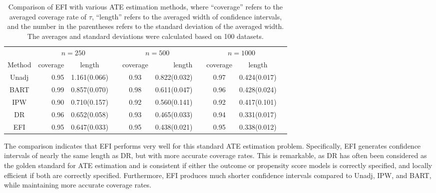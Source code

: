 \documentclass[11pt]{article}
\begin{document}
 \begin{table}[htbp]
\caption{Comparison of EFI with various ATE estimation methods, where “coverage” refers to the averaged coverage rate of  $\tau$,  “length” refers to the averaged width of confidence intervals, and the number in the parentheses refers to the standard deviation of the averaged width. The averages and standard deviations  were calculated based on 100 datasets.}
\label{causal:ATE}
\vspace{-0.15in}
\begin{center}
\begin{tabular}{crcccrcccc} \toprule
   &\multicolumn{2}{c}{$n=250$} & &  \multicolumn{2}{c}{$n=500$} & &  \multicolumn{2}{c}{$n=1000$}\\  
  \cline{2-3} \cline{5-6}  \cline{8-9} 
  Method  & coverage & length & &  coverage & length & & coverage & length\\ 
  \midrule
 Unadj  & 0.95 & 1.161(0.066) & &  0.93 & 0.822(0.032)  & & 0.97 & 0.424(0.017)\\ 
 BART   & 0.99 & 0.857(0.070) & &   0.98  & 0.611(0.047) & & 0.96 & 0.428(0.024)\\ 
IPW  & 0.90 &  0.710(0.157) & &  0.92 & 0.560(0.141) & & 0.92 & 0.417(0.101)\\ 
DR  & 0.96 & 0.652(0.058) & &   0.93 & 0.465(0.033) & & 0.94 & 0.331(0.017)\\ 
EFI  & 0.95& 0.647(0.033) & &  0.95 & 0.438(0.021) & & 0.95 & 0.338(0.012)\\ 
\bottomrule
\end{tabular}
\end{center}
\end{table}


The comparison indicates that EFI performs very well for this standard ATE estimation problem. Specifically, EFI generates confidence intervals of nearly the same length as DR, but with more accurate coverage rates. 
This is remarkable, as DR has often been considered as the golden standard for ATE estimation and is consistent if either the outcome or propensity score models is correctly specified,  and locally efficient if both are correctly specified. 
Furthermore, EFI produces much shorter confidence intervals compared to Unadj, IPW, and BART, while maintaining more accurate coverage rates. 
\end{document}
